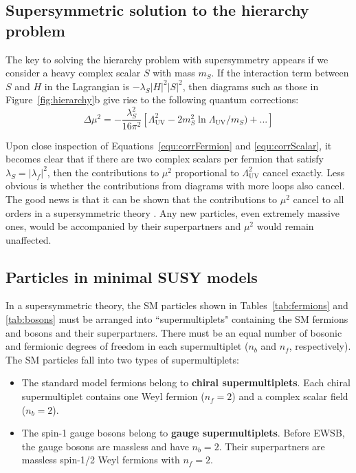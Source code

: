 \subsection{Supersymmetric solution to the hierarchy problem}
\label{sec:SUSYhierarchy}

The key to solving the hierarchy problem with supersymmetry appears if we consider a heavy complex scalar $S$ with mass $m_S$. If the interaction term between $S$ and $H$ in the Lagrangian is $-\lambda_S|H|^2|S|^2$, then diagrams such as those in Figure~\ref{fig:hierarchy}b give rise to the following quantum corrections:
\begin{equation}
\Delta\mu^2 = -\frac{\lambda_S^2}{16\pi^2} [ \Lambda^2_\mathrm{UV} - 2 m_S^2 \ln{\Lambda_\mathrm{UV} / m_S) }+ ... ]
\label{equ:corrScalar}
\end{equation}

Upon close inspection of Equations~\ref{equ:corrFermion} and \ref{equ:corrScalar}, it becomes clear that if
there are two complex scalars per fermion that satisfy $\lambda_S = |\lambda_f|^2$, then the contributions to $\mu^2$ proportional to $ \Lambda^2_\mathrm{UV}$ cancel exactly. 
Less obvious is whether the contributions from diagrams with more loops also cancel. The good news is that it can be shown that 
the contributions to $\mu^2$ cancel to all orders in a supersymmetric theory \cite{SUSYproof}. Any new particles, even extremely massive ones, would be
accompanied by their superpartners and $\mu^2$ would remain unaffected.


\subsection{Particles in minimal SUSY models}
\label{sec:SUSYparticles}
In a supersymmetric theory, the SM particles shown in Tables~\ref{tab:fermions} and \ref{tab:bosons} must be arranged into ``supermultiplets" containing the SM fermions and bosons and their superpartners. There must be an equal number of bosonic and fermionic degrees of freedom in each supermultiplet ($n_b$ and $n_f$, respectively). The SM particles fall into two types of supermultiplets:
\begin{itemize}
\item The standard model fermions belong to \textbf{chiral supermultiplets}. Each chiral supermultiplet contains one Weyl fermion ($n_f = 2$) and a complex scalar field ($n_b = 2$).
\item The spin-1 gauge bosons belong to \textbf{gauge supermultiplets}. Before EWSB, the gauge bosons are massless and have $n_b = 2$. Their superpartners are massless spin-1/2 Weyl fermions with $n_f = 2$. 
\end{itemize}

